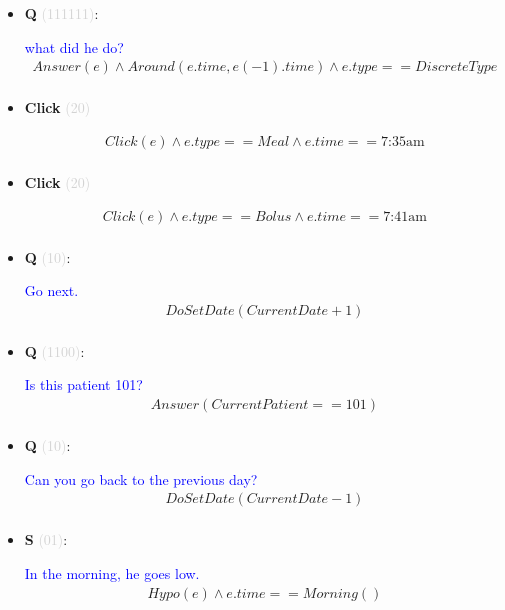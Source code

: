 \documentclass[11pt]{article}
\newcounter{CQ}
\newcounter{CS}
\newcounter{CClick}
\newcommand{\key}[1]{\textcolor{lightgray}{#1}}
\begin{document}
\begin{itemize}
	
	\item
	\textbf{Q\theCQ} \key{(111111)}: \addtocounter{CQ}{1}
	\textcolor{blue}{ what did he do? }
	\begin{multline*}
	Answer(e) \wedge Around(e.time, e(-1).time) \wedge e.type==DiscreteType \\
	\end{multline*}
	
	
	\item
	\textbf{Click\theCClick} \key{(20)} \addtocounter{CClick}{1}
	\begin{multline*}
	Click(e) \wedge e.type == Meal \wedge e.time == \mbox{7:35am}  \\
	\end{multline*}
	
	
	\item
	\textbf{Click\theCClick} \key{(20)} \addtocounter{CClick}{1}
	\begin{multline*}
	Click(e) \wedge e.type == Bolus \wedge e.time == \mbox{7:41am}  \\
	\end{multline*}
	
	
	
	\item
	\textbf{Q\theCQ} \key{(10)}: \addtocounter{CQ}{1}
	\textcolor{blue}{ Go next. }
	\begin{multline*}
	DoSetDate(CurrentDate + 1) \\
	\end{multline*}
	
	
	\item
	\textbf{Q\theCQ} \key{(1100)}: \addtocounter{CQ}{1}
	\textcolor{blue}{ Is this patient 101? }
	\begin{multline*}
	Answer(CurrentPatient == 101) \\
	\end{multline*}
	
	
	
	\item
	\textbf{Q\theCQ} \key{(10)}: \addtocounter{CQ}{1}
	\textcolor{blue}{ Can you go back to the previous day? }
	\begin{multline*}
	DoSetDate(CurrentDate - 1) \\
	\end{multline*}
	
	
	\item
	\textbf{S\theCS} \key{(01)}: \addtocounter{CS}{1}
	\textcolor{blue}{ In the morning, he goes low.}
	\begin{multline*}
	Hypo(e) \wedge e.time==Morning() \\
	\end{multline*}
	

\end{itemize}
\end{document}
